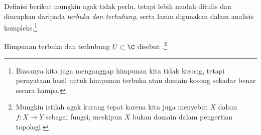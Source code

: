 
Definisi berikut mungkin agak tidak perlu, tetapi lebih mudah ditulis dan
diucapkan daripada \emph{terbuka dan terhubung}, serta lazim digunakan dalam
analisis kompleks.\footnote{Biasanya kita juga menganggap himpunan kita tidak
kosong, tetapi pernyataan hasil untuk himpunan terbuka atau domain kosong
sekadar benar secara hampa.}

\begin{defn}
Himpunan terbuka dan terhubung $U \subset \C$ disebut
\emph{}.\footnote{Mungkin istilah  agak
kurang tepat karena kita juga menyebut $X$ dalam $f \colon X \to Y$ sebagai
 fungsi, meskipun $X$ bukan domain dalam pengertian topologi.}
\end{defn}

